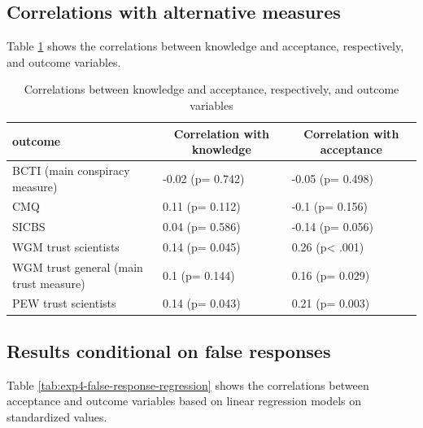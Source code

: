 \documentclass[
  doc,floatsintext]{apa6}
\begin{document}
\subsection{Correlations with alternative measures}\label{correlations-with-alternative-measures-3}

Table \ref{tab:exp4-correlations-outcomes} shows the correlations between knowledge and acceptance, respectively, and outcome variables.

\begin{table}[tbp]

\begin{center}
\begin{threeparttable}

\caption{\label{tab:exp4-correlations-outcomes}Correlations between knowledge and acceptance, respectively, and outcome variables}

\begin{tabular}{lll}
\toprule
outcome & \multicolumn{1}{c}{Correlation with knowledge} & \multicolumn{1}{c}{Correlation with acceptance}\\
\midrule
BCTI (main conspiracy measure) & -0.02 (p= 0.742) & -0.05 (p= 0.498)\\
CMQ & 0.11 (p= 0.112) & -0.1 (p= 0.156)\\
SICBS & 0.04 (p= 0.586) & -0.14 (p= 0.056)\\
WGM trust scientists & 0.14 (p= 0.045) & 0.26 (p< .001)\\
WGM trust general (main trust measure) & 0.1 (p= 0.144) & 0.16 (p= 0.029)\\
PEW trust scientists & 0.14 (p= 0.043) & 0.21 (p= 0.003)\\
\bottomrule
\end{tabular}

\end{threeparttable}
\end{center}

\end{table}

\subsection{Results conditional on false responses}\label{results-conditional-on-false-responses-3}

Table \ref{tab:exp4-false-response-regression} shows the correlations between acceptance and outcome variables based on linear regression models on standardized values.
\end{document}
